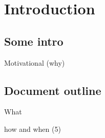 \chapter{Introduction}

\section{Some intro}

Motivational (why)




\section{Document outline}

What

how and when (5)


\cite{latexcompanion}